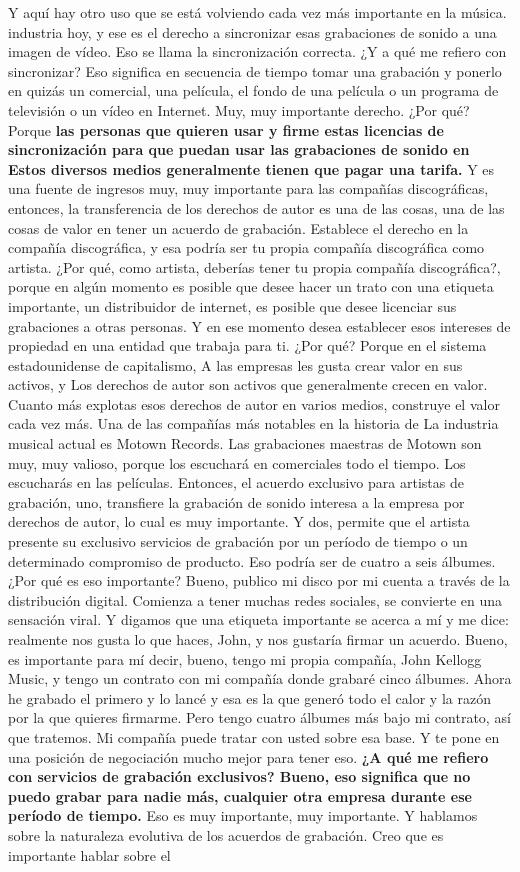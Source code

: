 \documentclass[10pt]{book}
\begin{document}
Y aquí hay otro uso que se está volviendo cada vez más importante en la música. industria hoy, y ese es el derecho a sincronizar esas grabaciones de sonido a una imagen de vídeo. Eso se llama la sincronización correcta. ¿Y a qué me refiero con sincronizar? Eso significa en secuencia de tiempo tomar una grabación y ponerlo en quizás un comercial, una película, el fondo de una película o un programa de televisión o un vídeo en Internet. Muy, muy importante derecho. ¿Por qué? Porque \textbf{las personas que quieren usar y firme estas licencias de sincronización para que puedan usar las grabaciones de sonido en Estos diversos medios generalmente tienen que pagar una tarifa.} Y es una fuente de ingresos muy, muy importante para las compañías discográficas, entonces, la transferencia de los derechos de autor es una de las cosas, una de las cosas de valor en tener un acuerdo de grabación. Establece el derecho en la compañía discográfica, y esa podría ser tu propia compañía discográfica como artista. ¿Por qué, como artista, deberías tener tu propia compañía discográfica?, porque en algún momento es posible que desee hacer un trato con una etiqueta importante, un distribuidor de internet, es posible que desee licenciar sus grabaciones a otras personas. Y en ese momento desea establecer esos intereses de propiedad en una entidad que trabaja para ti. ¿Por qué? Porque en el sistema estadounidense de capitalismo, A las empresas les gusta crear valor en sus activos, y Los derechos de autor son activos que generalmente crecen en valor. Cuanto más explotas esos  derechos de autor en varios medios, construye el valor cada vez más. Una de las compañías más notables en la historia de La industria musical actual es Motown Records. Las grabaciones maestras de Motown son muy, muy valioso, porque los escuchará en comerciales todo el tiempo. Los escucharás en las películas. Entonces, el acuerdo exclusivo para artistas de grabación, uno, transfiere la grabación de sonido interesa a la empresa por derechos de autor, lo cual es muy importante. Y dos, permite que el artista presente su exclusivo servicios de grabación por un período de tiempo o un determinado compromiso de producto. Eso podría ser de cuatro a seis álbumes. ¿Por qué es eso importante? Bueno, publico mi disco por mi cuenta a través de la distribución digital. Comienza a tener muchas redes sociales, se convierte en una sensación viral. Y digamos que una etiqueta importante se acerca a mí y me dice: realmente nos gusta lo que haces, John, y nos gustaría firmar un acuerdo. Bueno, es importante para mí decir, bueno, tengo mi propia compañía, John Kellogg Music, y tengo un contrato con mi compañía donde grabaré cinco álbumes. Ahora he grabado el primero y lo lancé y esa es la que generó todo el calor y la razón por la que quieres firmarme. Pero tengo cuatro álbumes más bajo mi contrato, así que tratemos. Mi compañía puede tratar con usted sobre esa base. Y te pone en una posición de negociación mucho mejor para tener eso. \textbf{¿A qué me refiero con servicios de grabación exclusivos? Bueno, eso significa que no puedo grabar para nadie más, cualquier otra empresa durante ese período de tiempo.} Eso es muy importante, muy importante. Y hablamos sobre la naturaleza evolutiva de los acuerdos de grabación. Creo que es importante hablar sobre el 
\end{document}
